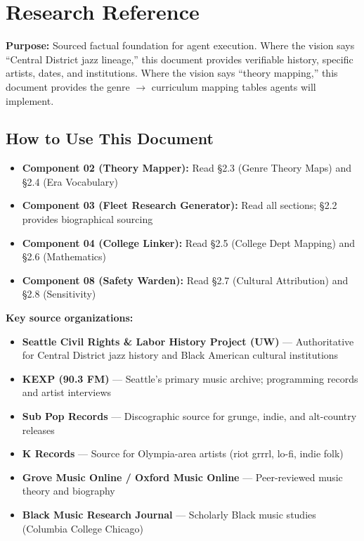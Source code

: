 \documentclass[11pt,letterpaper]{article}
\newcommand{\stageheader}[2]{%
  \noindent\colorbox{#2}{\makebox[\textwidth][l]{%
    \textcolor{white}{\bfseries\sffamily\large\hspace{8pt}#1\hspace{8pt}}}}%
  \vspace{0.6em}\par%
}
\newcommand{\metafield}[2]{\textbf{\sffamily\textcolor{primary}{#1}} \textcolor{darktext}{#2}\par}
\begin{document}
\newpage

\stageheader{STAGE 2 \quad RESEARCH REFERENCE}{secondary}

\section{Research Reference}

\metafield{Purpose:}{Sourced factual foundation for agent execution. Where the vision says
``Central District jazz lineage,'' this document provides verifiable history, specific
artists, dates, and institutions. Where the vision says ``theory mapping,'' this document
provides the genre $\rightarrow$ curriculum mapping tables agents will implement.}

\subsection{How to Use This Document}

\begin{itemize}[leftmargin=2em]
  \item \textbf{Component 02 (Theory Mapper):} Read \S2.3 (Genre Theory Maps) and \S2.4 (Era Vocabulary)
  \item \textbf{Component 03 (Fleet Research Generator):} Read all sections; \S2.2 provides biographical sourcing
  \item \textbf{Component 04 (College Linker):} Read \S2.5 (College Dept Mapping) and \S2.6 (Mathematics)
  \item \textbf{Component 08 (Safety Warden):} Read \S2.7 (Cultural Attribution) and \S2.8 (Sensitivity)
\end{itemize}

\textbf{Key source organizations:}
\begin{itemize}[leftmargin=2em]
  \item \textbf{Seattle Civil Rights \& Labor History Project (UW)} --- Authoritative for Central District jazz history and Black American cultural institutions
  \item \textbf{KEXP (90.3 FM)} --- Seattle's primary music archive; programming records and artist interviews
  \item \textbf{Sub Pop Records} --- Discographic source for grunge, indie, and alt-country releases
  \item \textbf{K Records} --- Source for Olympia-area artists (riot grrrl, lo-fi, indie folk)
  \item \textbf{Grove Music Online / Oxford Music Online} --- Peer-reviewed music theory and biography
  \item \textbf{Black Music Research Journal} --- Scholarly Black music studies (Columbia College Chicago)
\end{itemize}
\end{document}
